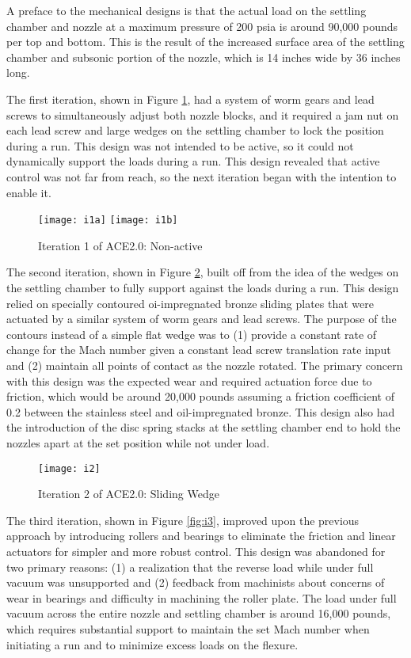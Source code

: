 A preface to the mechanical designs is that the actual load on the settling chamber and nozzle at a maximum pressure of 200 psia is around 90,000 pounds per top and bottom. This is the result of the increased surface area of the settling chamber and subsonic portion of the nozzle, which is 14 inches wide by 36 inches long.

The first iteration, shown in Figure \ref{fig:i1}, had a system of worm gears and lead screws to simultaneously adjust both nozzle blocks, and it required a jam nut on each lead screw and large wedges on the settling chamber to lock the position during a run. This design was not intended to be active, so it could not dynamically support the loads during a run. This design revealed that active control was not far from reach, so the next iteration began with the intention to enable it.

\begin{figure}[ht!]
    \centering
    \texttt{[image: i1a]}
    \texttt{[image: i1b]}
    \caption{Iteration 1 of ACE2.0: Non-active}
    \label{fig:i1}
\end{figure}

The second iteration, shown in Figure \ref{fig:i2}, built off from the idea of the wedges on the settling chamber to fully support against the loads during a run. This design relied on specially contoured oi-impregnated bronze sliding plates that were actuated by a similar system of worm gears and lead screws. The purpose of the contours instead of a simple flat wedge was to (1) provide a constant rate of change for the Mach number given a constant lead screw translation rate input and (2) maintain all points of contact as the nozzle rotated. The primary concern with this design was the expected wear and required actuation force due to friction, which would be around 20,000 pounds assuming a friction coefficient of 0.2 between the stainless steel and oil-impregnated bronze. This design also had the introduction of the disc spring stacks at the settling chamber end to hold the nozzles apart at the set position while not under load. 

\begin{figure}[ht!]
    \centering
    \texttt{[image: i2]}
    \caption{Iteration 2 of ACE2.0: Sliding Wedge}
    \label{fig:i2}
\end{figure}

The third iteration, shown in Figure \ref{fig:i3}, improved upon the previous approach by introducing rollers and bearings to eliminate the friction and linear actuators for simpler and more robust control. This design was abandoned for two primary reasons: (1) a realization that the reverse load while under full vacuum was unsupported and (2) feedback from machinists about concerns of wear in bearings and difficulty in machining the roller plate. The load under full vacuum across the entire nozzle and settling chamber is around 16,000 pounds, which requires substantial support to maintain the set Mach number when initiating a run and to minimize excess loads on the flexure.

